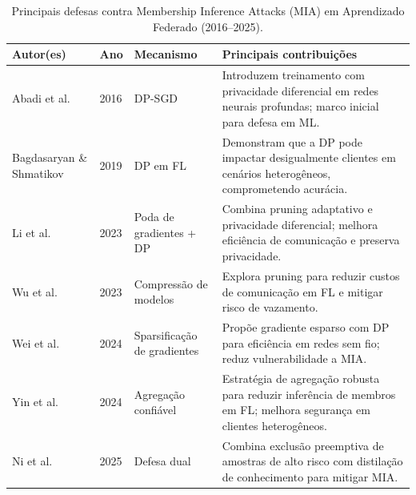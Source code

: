 \documentclass[
	12pt,				%
	openright,			%
	oneside,			%
	a4paper,			%
	english,			%
	french,				%
	spanish,			%
	brazil,				%
	]{abntex2}
\begin{document}
\begin{table}[H]
\centering
\footnotesize
\caption{Principais defesas contra Membership Inference Attacks (MIA) em Aprendizado Federado (2016–2025).}
\label{tab:defesas_mia}
\begin{tabular}{p{3.2cm}p{1.2cm}p{3.0cm}p{6.2cm}}
\toprule
\textbf{Autor(es)} & \textbf{Ano} & \textbf{Mecanismo} & \textbf{Principais contribuições} \\
\midrule
Abadi et al. \cite{abadi2016dpsgd} & 2016 & DP-SGD & Introduzem treinamento com privacidade diferencial em redes neurais profundas; marco inicial para defesa em ML. \\
Bagdasaryan \& Shmatikov \cite{bagdasaryan2019dpimpact} & 2019 & DP em FL & Demonstram que a DP pode impactar desigualmente clientes em cenários heterogêneos, comprometendo acurácia. \\
Li et al. \cite{li2023gradientpruning} & 2023 & Poda de gradientes + DP & Combina pruning adaptativo e privacidade diferencial; melhora eficiência de comunicação e preserva privacidade. \\
Wu et al. \cite{wu2023pruningfl} & 2023 & Compressão de modelos & Explora pruning para reduzir custos de comunicação em FL e mitigar risco de vazamento. \\
Wei et al. \cite{wei2024gradientsparsification} & 2024 & Sparsificação de gradientes & Propõe gradiente esparso com DP para eficiência em redes sem fio; reduz vulnerabilidade a MIA. \\
Yin et al. \cite{yin2024miafl} & 2024 & Agregação confiável & Estratégia de agregação robusta para reduzir inferência de membros em FL; melhora segurança em clientes heterogêneos. \\
Ni et al. \cite{niu2025dualdefense} & 2025 & Defesa dual  & Combina exclusão preemptiva de amostras de alto risco com distilação de conhecimento para mitigar MIA. \\
\bottomrule
\end{tabular}
\\[0.5em]
\end{table}


\end{document}
